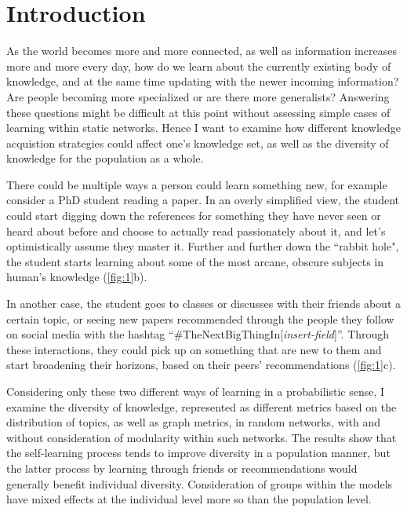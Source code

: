 \section{Introduction}

As the world becomes more and more connected, as well as information increases more and more every day, how do we learn about the currently existing body of knowledge, and at the same time updating with the newer incoming information? Are people becoming more specialized or are there more generalists? Answering these questions might be difficult at this point without assessing simple cases of learning within static networks. Hence I want to examine how different knowledge acquistion strategies could affect one's knowledge set, as well as the diversity of knowledge for the population as a whole.

There could be multiple ways a person could learn something new, for example consider a PhD student reading a paper. In an overly simplified view, the student could start digging down the references for something they have never seen or heard about before and choose to actually read passionately about it, and let's optimistically assume they master it. Further and further down the    ``rabbit hole", the student starts learning about some of the most arcane, obscure subjects in human's knowledge (\autoref{fig:1}b).

In another case, the student goes to classes or discusses with their friends about a certain topic, or seeing new papers recommended through the people they follow on social media with the hashtag ``\#TheNextBigThingIn[\textit{insert-field}]''. Through these interactions, they could pick up on something that are new to them and start broadening their horizons, based on their peers' recommendations (\autoref{fig:1}c).

Considering only these two different ways of learning in a probabilistic sense, I examine the diversity of knowledge, represented as different metrics based on the distribution of topics, as well as graph metrics, in random networks, with and without consideration of modularity within such networks. The results show that the self-learning process tends to improve diversity in a population manner, but the latter process by learning through friends or recommendations would generally benefit individual diversity. Consideration of groups within the models have mixed effects at the individual level more so than the population level.